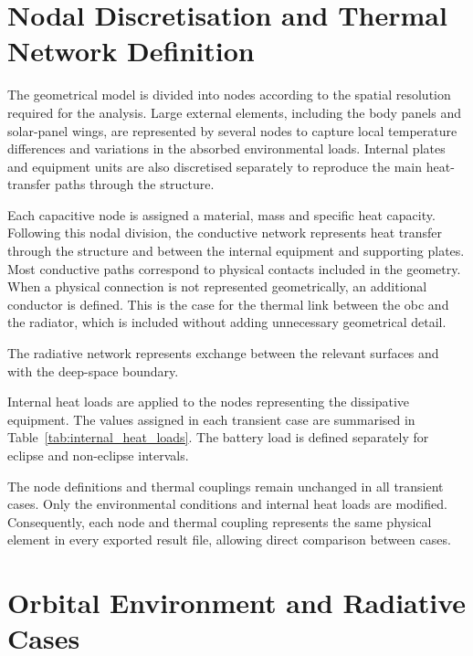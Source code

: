 \FloatBarrier


\section{Nodal Discretisation and Thermal Network Definition}
\label{sec:thermal_network_definition}

The geometrical model is divided into nodes according to the spatial 
resolution required for the analysis. Large external elements, including the 
body panels and solar-panel wings, are represented by several nodes to capture 
local temperature differences and variations in the absorbed environmental loads. 
Internal plates and equipment units are also discretised separately to 
reproduce the main heat-transfer paths through the structure.

Each capacitive node is assigned a material, mass and specific heat capacity.
Following this nodal division, the conductive network represents 
heat transfer through the structure and between the internal equipment 
and supporting plates. Most conductive 
paths correspond to physical contacts included in the geometry. When a physical 
connection is not represented geometrically, an additional conductor is defined. 
This is the case for the thermal link between the \acrshort{obc} and the radiator, 
which is included without adding unnecessary geometrical detail.

The radiative network represents exchange between the relevant surfaces and with the 
deep-space boundary.

Internal heat loads are applied to the nodes representing the dissipative equipment. 
The values assigned in each transient case are summarised in 
Table~\ref{tab:internal_heat_loads}. The battery load is defined separately
for eclipse and non-eclipse intervals.



The node definitions and thermal couplings remain unchanged in all transient 
cases. Only the environmental conditions and internal heat loads are modified. Consequently, each node and thermal coupling 
represents the same physical element in every exported result file, allowing direct 
comparison between cases.


\section{Orbital Environment and Radiative Cases}
\label{sec:radiative_cases}

